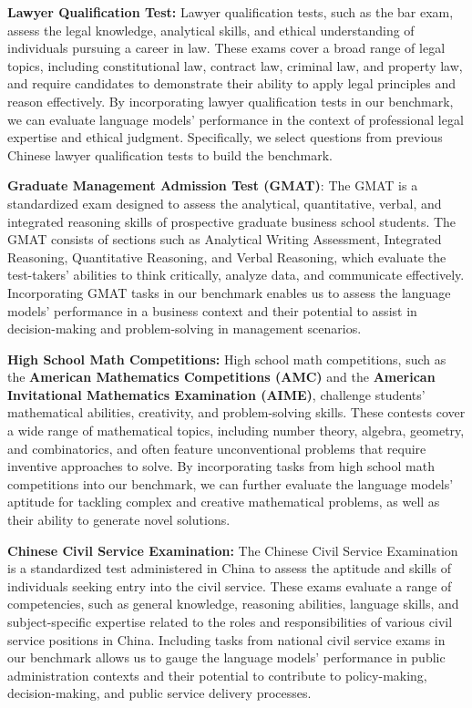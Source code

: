 \par{\textbf{Lawyer Qualification Test:} Lawyer qualification tests, such as the bar exam, assess the legal knowledge, analytical skills, and ethical understanding of individuals pursuing a career in law. These exams cover a broad range of legal topics, including constitutional law, contract law, criminal law, and property law, and require candidates to demonstrate their ability to apply legal principles and reason effectively. By incorporating lawyer qualification tests in our benchmark, we can evaluate language models' performance in the context of professional legal expertise and ethical judgment. Specifically, we select questions from previous Chinese lawyer qualification tests to build the benchmark.}

\par{\textbf{Graduate Management Admission Test (GMAT)}: The GMAT is a standardized exam designed to assess the analytical, quantitative, verbal, and integrated reasoning skills of prospective graduate business school students. The GMAT consists of sections such as Analytical Writing Assessment, Integrated Reasoning, Quantitative Reasoning, and Verbal Reasoning, which evaluate the test-takers' abilities to think critically, analyze data, and communicate effectively. Incorporating GMAT tasks in our benchmark enables us to assess the language models' performance in a business context and their potential to assist in decision-making and problem-solving in management scenarios.}

\par{\textbf{High School Math Competitions:} High school math competitions, such as the \textbf{American Mathematics Competitions (AMC)} and the \textbf{American Invitational Mathematics Examination (AIME)}, challenge students' mathematical abilities, creativity, and problem-solving skills. These contests cover a wide range of mathematical topics, including number theory, algebra, geometry, and combinatorics, and often feature unconventional problems that require inventive approaches to solve. By incorporating tasks from high school math competitions into our benchmark, we can further evaluate the language models' aptitude for tackling complex and creative mathematical problems, as well as their ability to generate novel solutions.}
\par{\textbf{Chinese Civil Service Examination:} The Chinese Civil Service Examination is a standardized test administered in China to assess the aptitude and skills of individuals seeking entry into the civil service. These exams evaluate a range of competencies, such as general knowledge, reasoning abilities, language skills, and subject-specific expertise related to the roles and responsibilities of various civil service positions in China. Including tasks from national civil service exams in our benchmark allows us to gauge the language models' performance in public administration contexts and their potential to contribute to policy-making, decision-making, and public service delivery processes.}

